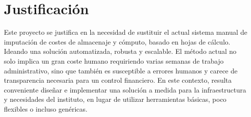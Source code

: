 \section{Justificación}
Este proyecto se justifica en la necesidad de sustituir el actual sistema manual de imputación 
de costes de almacenaje y cómputo, basado en hojas de cálculo. Ideando una solución automatizada, 
robusta y escalable. El método actual no solo implica un gran coste humano requiriendo varias semanas 
de trabajo administrativo, sino que también es susceptible a errores humanos y carece de transparencia 
necesaria para un control financiero. En este contexto, resulta conveniente diseñar e implementar una 
solución a medida para la infraestructura y necesidades del instituto, en lugar de utilizar herramientas 
básicas, poco flexibles o incluso genéricas.




